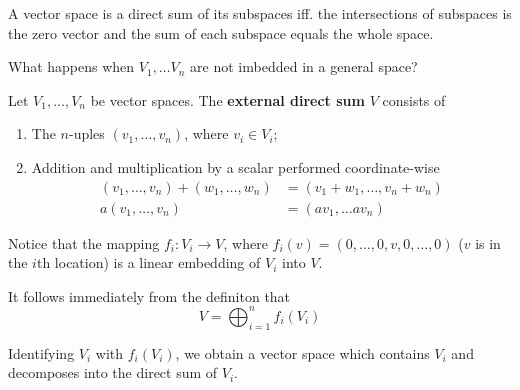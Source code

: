 A vector space is a direct sum of its subspaces iff. the intersections of subspaces is the zero vector and the sum of each subspace equals the whole space.

What happens when $V_1, \ldots V_n$ are not imbedded in a general space? 

\begin{definition}
	Let $V_1, \ldots, V_n$ be vector spaces. The \textbf{external direct sum} $V$ consists of 
	\begin{enumerate}
		\item The $n$-uples $(v_1, \ldots, v_n)$, where $v_i \in V_i$;
		\item Addition and multiplication by a scalar performed coordinate-wise 
		\begin{equation*}
			\begin{aligned}
				(v_1, \ldots, v_n) + (w_1, \ldots, w_n) &= (v_1 + w_1, \ldots, v_n + w_n) \\
				a (v_1, \ldots, v_n) &= (av_1, \ldots av_n)
			\end{aligned}
		\end{equation*}
	\end{enumerate}
\end{definition}

Notice that the mapping $f_i : V_i \longrightarrow V$, where $f_i(v) = (0, \ldots, 0, v, 0, \ldots, 0)$ ($v$ is in the $i$th location) is a linear embedding of $V_i$ into $V$.

It follows immediately from the definiton that
\[
	V = \bigoplus_{i=1}^n f_i(V_i)
\]

Identifying $V_i$ with $f_i(V_i)$, we obtain a vector space which contains $V_i$ and decomposes into the direct sum of $V_i$.
